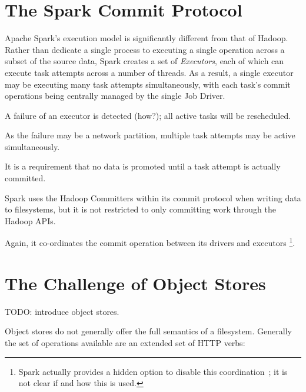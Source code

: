 \documentclass[conference]{IEEEtran}
\begin{document}

\section{The Spark Commit Protocol}
\label{sec:theSparkCommitProtocol}

Apache Spark's execution model is significantly different from
that of Hadoop.
Rather than dedicate a single process to executing a single operation
across a subset of the source data, Spark creates a set of \emph{Executors},
each of which can execute task attempts across a number of threads.
As a result, a single executor may be executing many task attempts
simultaneously, with each task's commit operations being centrally managed
by the single Job Driver.


A failure of an executor is detected (how?);
all active tasks will be rescheduled.

As the failure may be a network partition, multiple task attempts may be active
simultaneously.

It is a requirement that no data is promoted until a task attempt is actually
committed.


Spark uses the Hadoop Committers within its commit protocol when
writing data to filesystems, but it is not restricted to only committing work
through the Hadoop APIs.

Again, it co-ordinates the commit operation between its drivers and executors
\footnote{Spark actually provides a hidden option to disable this
coordination\ \cite{SPARK-8029}; it is not clear if and how this is used.}.




\section{The Challenge of Object Stores}
\label{sec:object-stores}


TODO: introduce object stores.



Object stores do not generally offer the full semantics of a filesystem.
Generally the set of operations available are an extended set of HTTP verbs:
\end{document}
